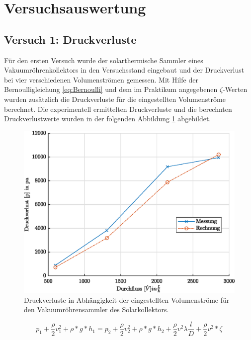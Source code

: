 \section{Versuchsauswertung}

\subsection{Versuch 1: Druckverluste}

Für den ersten Versuch wurde der solarthermische Sammler eines Vakuumröhrenkollektors in den Versuchsstand eingebaut und der Druckverlust bei vier verschiedenen Volumenströmen gemessen. 
Mit Hilfe der Bernoulligleichung \ref{eq:Bernoulli} und dem im Praktikum angegebenen $\zeta$-Werten wurden zusätzlich die Druckverluste für die eingestellten Volumenströme berechnet. Die experimentell ermittelten Druckverluste und die berechnten Druckverlustwerte wurden in der folgenden Abbildung \ref{fig:drucksammler} abgebildet. 

	\begin{figure}[H]
	\centering
	\includegraphics[height=0.3\textheight]{../DATA/dPPlot.eps}
	\caption[Druckverluste in Abhängigkeit der eingestellten Volumenströme für den Vakuumröhrensammler des Solarkollektors]{Druckverluste in Abhängigkeit der eingestellten Volumenströme für den Vakuumröhrensammler des Solarkollektors.}
	\label{fig:drucksammler}
	\end{figure}

\begin{equation}
	\label{eq:Bernoulli}
	p_1 + \frac{\rho}{2}v_1^2 + \rho*g*h_1 = p_2 + \frac{\rho}{2}v_2^2+\rho*g*h_2 + \frac{\rho}{2}v^2\lambda\frac{l}{D}+\frac{\rho}{2}v^2*\zeta
\end{equation}

